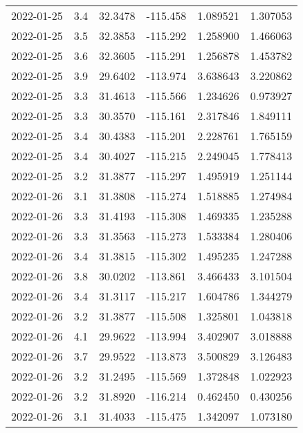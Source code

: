 \begin{tabular}{lrrrrr}
2022-01-25 &       3.4 &  32.3478 &  -115.458 &         1.089521 &         1.307053 \\
2022-01-25 &       3.5 &  32.3853 &  -115.292 &         1.258900 &         1.466063 \\
2022-01-25 &       3.6 &  32.3605 &  -115.291 &         1.256878 &         1.453782 \\
2022-01-25 &       3.9 &  29.6402 &  -113.974 &         3.638643 &         3.220862 \\
2022-01-25 &       3.3 &  31.4613 &  -115.566 &         1.234626 &         0.973927 \\
2022-01-25 &       3.3 &  30.3570 &  -115.161 &         2.317846 &         1.849111 \\
2022-01-25 &       3.4 &  30.4383 &  -115.201 &         2.228761 &         1.765159 \\
2022-01-25 &       3.4 &  30.4027 &  -115.215 &         2.249045 &         1.778413 \\
2022-01-25 &       3.2 &  31.3877 &  -115.297 &         1.495919 &         1.251144 \\
2022-01-26 &       3.1 &  31.3808 &  -115.274 &         1.518885 &         1.274984 \\
2022-01-26 &       3.3 &  31.4193 &  -115.308 &         1.469335 &         1.235288 \\
2022-01-26 &       3.3 &  31.3563 &  -115.273 &         1.533384 &         1.280406 \\
2022-01-26 &       3.4 &  31.3815 &  -115.302 &         1.495235 &         1.247288 \\
2022-01-26 &       3.8 &  30.0202 &  -113.861 &         3.466433 &         3.101504 \\
2022-01-26 &       3.4 &  31.3117 &  -115.217 &         1.604786 &         1.344279 \\
2022-01-26 &       3.2 &  31.3877 &  -115.508 &         1.325801 &         1.043818 \\
2022-01-26 &       4.1 &  29.9622 &  -113.994 &         3.402907 &         3.018888 \\
2022-01-26 &       3.7 &  29.9522 &  -113.873 &         3.500829 &         3.126483 \\
2022-01-26 &       3.2 &  31.2495 &  -115.569 &         1.372848 &         1.022923 \\
2022-01-26 &       3.2 &  31.8920 &  -116.214 &         0.462450 &         0.430256 \\
2022-01-26 &       3.1 &  31.4033 &  -115.475 &         1.342097 &         1.073180 \\

\end{tabular}
